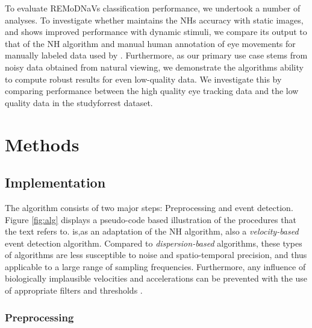    To evaluate REMoDNaVs classification performance, we undertook a number of analyses. To investigate whether
    \remodnav maintains the NHs accuracy with static images, and shows improved performance with dynamic stimuli, we
    compare its output to that of the NH algorithm and manual human annotation of eye movements for manually labeled
    data used by \cite{Andersson2017}. Furthermore, as our primary use case stems from noisy data obtained from natural
    viewing, we demonstrate the algorithms ability to compute robust results for even low-quality data. We investigate
    this by comparing performance between the high quality eye tracking data and the low quality data in the studyforrest
    dataset.




    \section*{Methods}\label{methods}


    \subsection*{\remodnav Implementation}\label{impl}


    The algorithm consists of two major steps: Preprocessing and event detection. Figure \ref{fig:alg} displays a
    pseudo-code based illustration of the procedures that the text refers to. \remodnav is,as an adaptation of the
    NH algorithm, also a \textit{velocity-based} event detection algorithm. Compared to \textit{dispersion-based}
    algorithms, these types of algorithms are less susceptible to noise and spatio-temporal precision, and thus
    applicable to a large range of sampling frequencies. Furthermore, any influence of biologically implausible
    velocities and accelerations can be prevented with the use of appropriate filters and thresholds
    \citep{holmqvist2011eye}.

    \subsubsection*{Preprocessing}

